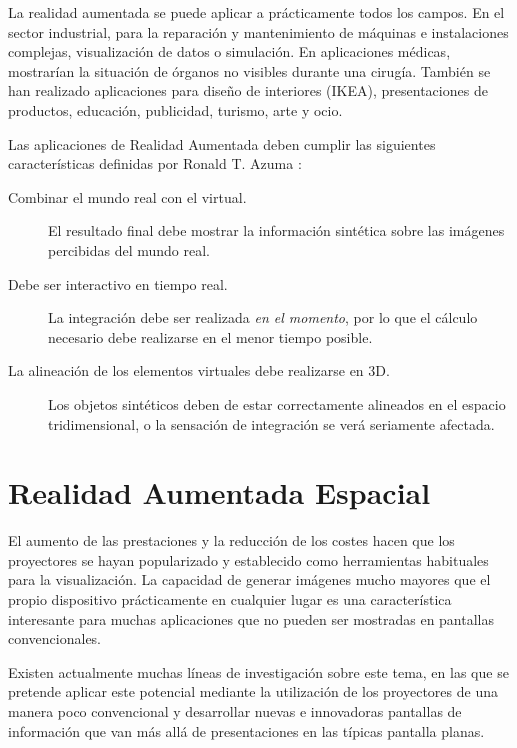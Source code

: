 La realidad aumentada se puede aplicar a prácticamente todos los campos. En el sector industrial, para la reparación y mantenimiento de máquinas e instalaciones complejas, visualización de datos o simulación.  En aplicaciones médicas, mostrarían la situación de órganos no visibles durante una cirugía. También se han realizado aplicaciones para diseño de interiores (IKEA), presentaciones de productos, educación, publicidad, turismo, arte y ocio. 

Las aplicaciones de Realidad Aumentada deben cumplir las siguientes características definidas por Ronald T. Azuma \cite{Azuma}:

\begin{description}
\item[Combinar el mundo real con el virtual.] El resultado final debe mostrar la información sintética sobre las imágenes percibidas del mundo real.
\item[Debe ser interactivo en tiempo real.] La integración debe ser realizada \emph{en el momento}, por lo que el cálculo necesario debe realizarse en el menor tiempo posible.
\item[La alineación de los elementos virtuales debe realizarse en 3D.] Los objetos sintéticos deben de estar correctamente alineados en el espacio tridimensional,  o la sensación de integración se verá seriamente afectada.
\end{description}

\section{Realidad Aumentada Espacial}
El aumento de las prestaciones y la reducción de los costes hacen que los proyectores se hayan popularizado y establecido como herramientas habituales para la visualización. La capacidad de generar imágenes mucho mayores que el propio dispositivo prácticamente en cualquier lugar es una característica interesante para muchas aplicaciones que no pueden ser mostradas en pantallas convencionales. 

Existen actualmente muchas líneas de investigación sobre este tema, en las que se pretende aplicar este potencial mediante la utilización de los proyectores de una manera poco convencional y desarrollar nuevas e innovadoras pantallas de información que van más allá de presentaciones en las típicas pantalla planas.
 

